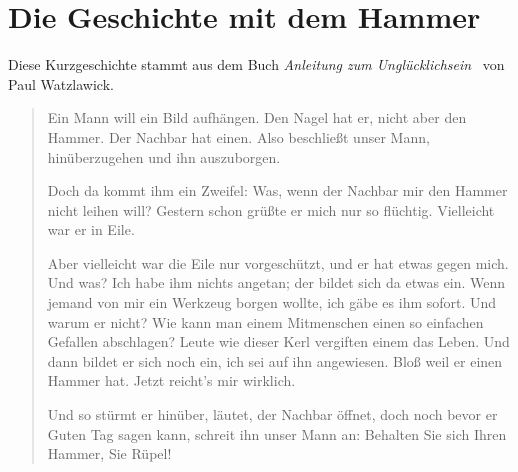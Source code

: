 \section{Die Geschichte mit dem Hammer}
\label{hammer-geschichte}

Diese Kurzgeschichte stammt aus dem Buch \emph{Anleitung zum Unglücklichsein}~\cite{anleitung-zum-ungluecklichsein} von Paul Watzlawick.

\begin{quote}

Ein Mann will ein Bild aufhängen. Den Nagel hat er, nicht aber den Hammer. Der Nachbar hat einen. Also beschließt unser Mann, hinüberzugehen und ihn auszuborgen.

Doch da kommt ihm ein Zweifel: Was, wenn der Nachbar mir den Hammer nicht leihen will? Gestern schon grüßte er mich nur so flüchtig. Vielleicht war er in Eile.

Aber vielleicht war die Eile nur vorgeschützt, und er hat etwas gegen mich. Und was? Ich habe ihm nichts angetan; der bildet sich da etwas ein. Wenn jemand von mir ein Werkzeug borgen wollte, ich gäbe es ihm sofort. Und warum er nicht? Wie kann man einem Mitmenschen einen so einfachen Gefallen abschlagen? Leute wie dieser Kerl vergiften einem das Leben. Und dann bildet er sich noch ein, ich sei auf ihn angewiesen. Bloß weil er einen Hammer hat. Jetzt reicht's mir wirklich.

Und so stürmt er hinüber, läutet, der Nachbar öffnet, doch noch bevor er \glqq Guten Tag\grqq{} sagen kann, schreit ihn unser Mann an: \glqq Behalten Sie sich Ihren Hammer, Sie Rüpel!\grqq

\end{quote}

